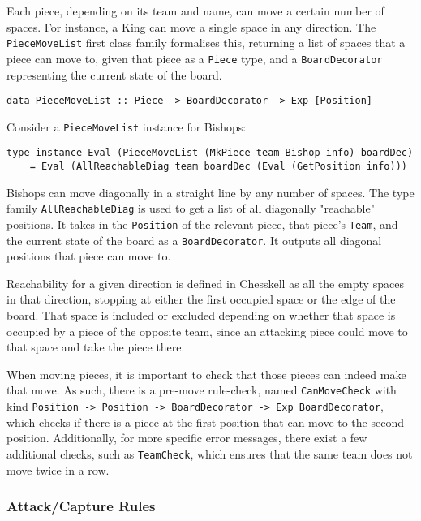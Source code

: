 \documentclass[12pt, a4paper, bibliography=totocnumbered]{scrreprt}
\newcommand{\inline}[1]{\lstinline[basicstyle=\ttfamily\footnotesize]{#1}}
\begin{document}
Each piece, depending on its team and name, can move a certain number of spaces. For instance, a King can move a single space in any direction. The \inline{PieceMoveList} first class family formalises this, returning a list of spaces that a piece can move to, given that piece as a \inline{Piece} type, and a \inline{BoardDecorator} representing the current state of the board.

\begin{lstlisting}
data PieceMoveList :: Piece -> BoardDecorator -> Exp [Position]
\end{lstlisting}

Consider a \inline{PieceMoveList} instance for Bishops:

\begin{lstlisting}
type instance Eval (PieceMoveList (MkPiece team Bishop info) boardDec)
    = Eval (AllReachableDiag team boardDec (Eval (GetPosition info)))
\end{lstlisting}

Bishops can move diagonally in a straight line by any number of spaces. The type family \inline{AllReachableDiag} is used to get a list of all diagonally "reachable" positions. It takes in the \inline{Position} of the relevant piece, that piece's \inline{Team}, and the current state of the board as a \inline{BoardDecorator}. It outputs all diagonal positions that piece can move to.

Reachability for a given direction is defined in Chesskell as all the empty spaces in that direction, stopping at either the first occupied space or the edge of the board. That space is included or excluded depending on whether that space is occupied by a piece of the opposite team, since an attacking piece could move to that space and take the piece there.

When moving pieces, it is important to check that those pieces can indeed make that move. As such, there is a pre-move rule-check, named \inline{CanMoveCheck} with kind \inline{Position -> Position -> BoardDecorator -> Exp BoardDecorator}, which checks if there is a piece at the first position that can move to the second position. Additionally, for more specific error messages, there exist a few additional checks, such as \inline{TeamCheck}, which ensures that the same team does not move twice in a row.

\subsubsection{Attack/Capture Rules}
\end{document}
